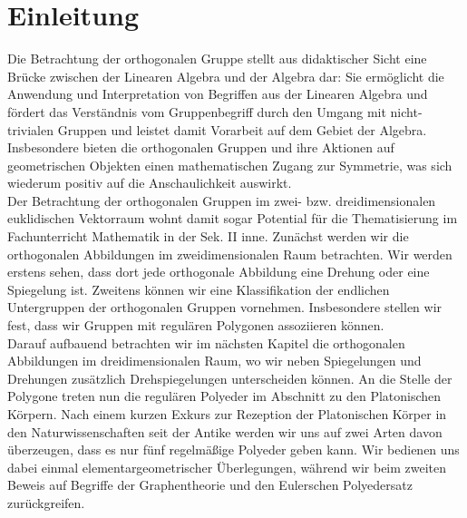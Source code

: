 \section{Einleitung}
Die Betrachtung der orthogonalen Gruppe stellt aus didaktischer Sicht eine Brücke zwischen der Linearen Algebra und der Algebra dar: Sie ermöglicht die Anwendung und Interpretation von Begriffen aus der Linearen Algebra und fördert das Verständnis vom Gruppenbegriff durch den Umgang mit nicht-trivialen Gruppen und leistet damit Vorarbeit auf dem Gebiet der Algebra. Insbesondere bieten die orthogonalen Gruppen und ihre Aktionen auf geometrischen Objekten einen mathematischen Zugang zur Symmetrie, was sich wiederum positiv auf die Anschaulichkeit auswirkt.\\
Der Betrachtung der orthogonalen Gruppen im zwei- bzw. dreidimensionalen euklidischen Vektorraum wohnt damit sogar Potential für die Thematisierung im Fachunterricht Mathematik in der Sek. II inne.
Zunächst werden wir die orthogonalen Abbildungen im zweidimensionalen Raum betrachten. Wir werden erstens sehen, dass dort jede orthogonale Abbildung eine Drehung oder eine Spiegelung ist. Zweitens können wir eine Klassifikation der endlichen Untergruppen der orthogonalen Gruppen vornehmen. Insbesondere stellen wir fest, dass wir Gruppen mit regulären Polygonen assoziieren können.\\
Darauf aufbauend betrachten wir im nächsten Kapitel die orthogonalen Abbildungen im dreidimensionalen Raum, wo wir neben Spiegelungen und Drehungen zusätzlich Drehspiegelungen unterscheiden können. An die Stelle der Polygone treten nun die regulären Polyeder im Abschnitt zu den Platonischen Körpern. Nach einem kurzen Exkurs zur Rezeption der Platonischen Körper in den Naturwissenschaften seit der Antike werden wir uns auf zwei Arten davon überzeugen, dass es nur fünf regelmäßige Polyeder geben kann. Wir bedienen uns dabei einmal elementargeometrischer Überlegungen, während wir beim zweiten Beweis auf Begriffe der Graphentheorie und den Eulerschen Polyedersatz zurückgreifen.\\
